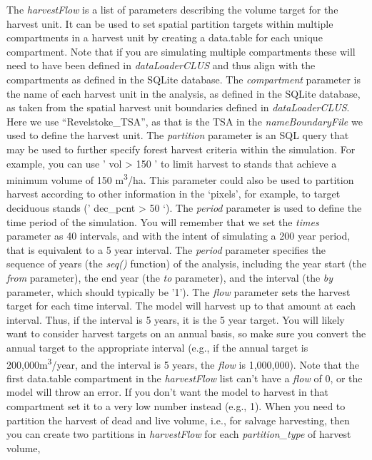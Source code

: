 \documentclass[
]{article}
\begin{document}
The \emph{harvestFlow} is a list of parameters describing the volume
target for the harvest unit. It can be used to set spatial partition
targets within multiple compartments in a harvest unit by creating a
data.table for each unique compartment. Note that if you are simulating
multiple compartments these will need to have been defined in
\emph{dataLoaderCLUS} and thus align with the compartments as defined in
the SQLite database. The \emph{compartment} parameter is the name of
each harvest unit in the analysis, as defined in the SQLite database, as
taken from the spatial harvest unit boundaries defined in
\emph{dataLoaderCLUS}. Here we use ``Revelstoke\_TSA'', as that is the
TSA in the \emph{nameBoundaryFile} we used to define the harvest unit.
The \emph{partition} parameter is an SQL query that may be used to
further specify forest harvest criteria within the simulation. For
example, you can use ' vol \textgreater{} 150 ' to limit harvest to
stands that achieve a minimum volume of 150 m\textsuperscript{3}/ha.
This parameter could also be used to partition harvest according to
other information in the `pixels', for example, to target deciduous
stands (' dec\_pcnt \textgreater{} 50 `). The \emph{period} parameter is
used to define the time period of the simulation. You will remember that
we set the \emph{times} parameter as 40 intervals, and with the intent
of simulating a 200 year period, that is equivalent to a 5 year
interval. The \emph{period} parameter specifies the sequence of years
(the \emph{seq()} function) of the analysis, including the year start
(the \emph{from} parameter), the end year (the \emph{to} parameter), and
the interval (the \emph{by} parameter, which should typically be '1').
The \emph{flow} parameter sets the harvest target for each time
interval. The model will harvest up to that amount at each interval.
Thus, if the interval is 5 years, it is the 5 year target. You will
likely want to consider harvest targets on an annual basis, so make sure
you convert the annual target to the appropriate interval (e.g., if the
annual target is 200,000m\textsuperscript{3}/year, and the interval is 5
years, the \emph{flow} is 1,000,000). Note that the first data.table
compartment in the \emph{harvestFlow} list can't have a \emph{flow} of
0, or the model will throw an error. If you don't want the model to
harvest in that compartment set it to a very low number instead (e.g.,
1). When you need to partition the harvest of dead and live volume,
i.e., for salvage harvesting, then you can create two partitions in
\emph{harvestFlow} for each \emph{partition\_type} of harvest volume,
\end{document}
